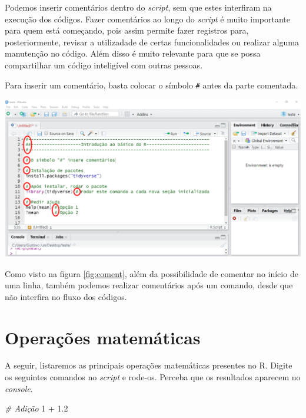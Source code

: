 \documentclass[
  brazilian,
]{book}
\newenvironment{Shaded}{\begin{snugshade}}{\end{snugshade}}
\newcommand{\CommentTok}[1]{\textcolor[rgb]{0.56,0.35,0.01}{\textit{#1}}}
\newcommand{\DecValTok}[1]{\textcolor[rgb]{0.00,0.00,0.81}{#1}}
\newcommand{\FloatTok}[1]{\textcolor[rgb]{0.00,0.00,0.81}{#1}}
\newcommand{\SpecialCharTok}[1]{\textcolor[rgb]{0.00,0.00,0.00}{#1}}
\let\origfigure\figure
\let\endorigfigure\endfigure
\renewenvironment{figure}[1][2] {
    \expandafter\origfigure\expandafter[H]
} {
    \endorigfigure
}
\begin{document}
Podemos inserir comentários dentro do \emph{script}, sem que estes interfiram na execução dos códigos. Fazer comentários ao longo do \emph{script} é muito importante para quem está começando, pois assim permite fazer registros para, posteriormente, revisar a utilizadade de certas funcionalidades ou realizar alguma manutenção no código. Além disso é muito relevante para que se possa compartilhar um código inteligível com outras pessoas.

Para inserir um comentário, basta colocar o símbolo \texttt{\#} antes da parte comentada.

\begin{figure}

{\centering \includegraphics[width=0.8\linewidth]{imagens/comentario} 

}

\caption{Perceba que os comentários apresentam uma coloração diferenciada e padronizada no script.}\label{fig:coment}
\end{figure}

Como visto na figura \ref{fig:coment}, além da possibilidade de comentar no início de uma linha, também podemos realizar comentários após um comando, desde que não interfira no fluxo dos códigos.

\hypertarget{operauxe7uxf5es-matemuxe1ticas}{%
\section{Operações matemáticas}\label{operauxe7uxf5es-matemuxe1ticas}}

A seguir, listaremos as principais operações matemáticas presentes no R. Digite os seguintes comandos no \emph{script} e rode-os. Perceba que os resultados aparecem no \emph{console}.

\begin{Shaded}
\begin{Highlighting}[]
\CommentTok{\# Adição}
\DecValTok{1} \SpecialCharTok{+} \FloatTok{1.2}
\end{Highlighting}
\end{Shaded}
\end{document}
